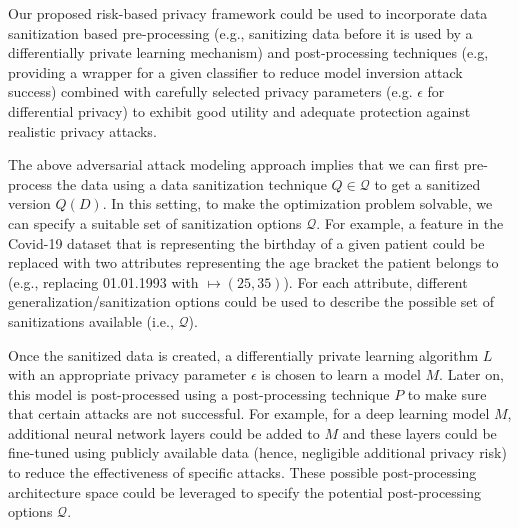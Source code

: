 \documentclass{article}
\begin{document}
Our proposed risk-based privacy framework could be used to incorporate data sanitization based pre-processing (e.g., sanitizing data before it is used by a differentially private learning mechanism) and post-processing  techniques (e.g, providing a wrapper for a given classifier to reduce model inversion attack success) combined with carefully selected privacy parameters (e.g. $\epsilon$ for differential privacy) to exhibit good utility and adequate protection against realistic privacy attacks.  

The above adversarial attack modeling approach implies that we can first pre-process the data using a data sanitization technique $Q \in \mathcal{Q}$ to get a sanitized version $Q(D)$. In this setting, to make the optimization problem solvable, we can specify a suitable set of sanitization options $\mathcal{Q}$. 
For example, a feature in the Covid-19 dataset that is representing the birthday of a given patient could be replaced with two attributes representing the age bracket the patient belongs to (e.g., replacing 01.01.1993 with $\mapsto (25,35)$). For each attribute, different generalization/sanitization options could be used to describe the possible set of sanitizations available (i.e., $\mathcal{Q}$).

Once the sanitized data is created, a differentially private learning algorithm $L$ with an appropriate privacy parameter $\epsilon$ is chosen to learn a model $M$. Later on, this model is post-processed using a post-processing technique $P$ to make sure that certain attacks are not successful. For example, for a deep learning model $M$, additional neural network layers could be added to $M$ and these layers could be fine-tuned using publicly available data (hence, negligible additional privacy risk) to reduce the effectiveness of specific attacks. These possible post-processing architecture space could be leveraged to specify the potential post-processing options $\mathcal{Q}$. 
\end{document}
